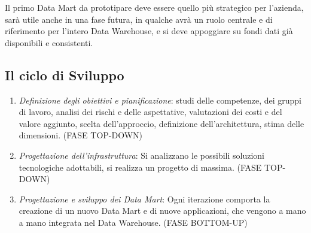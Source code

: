 Il primo Data Mart da prototipare deve essere quello più strategico per l'azienda, sarà utile anche in una fase futura, in qualche avrà un ruolo centrale e di riferimento per l'intero Data Warehouse, e si deve appoggiare su fondi dati già disponibili e consistenti.

\subsection{Il ciclo di Sviluppo}

\begin{enumerate}
	\item \textit{Definizione degli obiettivi e pianificazione}: studi delle competenze, dei gruppi di lavoro, analisi dei rischi e delle aspettative, valutazioni dei costi e del valore aggiunto, scelta dell'approccio, definizione dell'architettura, stima delle dimensioni. (FASE TOP-DOWN)
	\item \textit{Progettazione dell'infrastruttura}: Si analizzano le possibili soluzioni tecnologiche adottabili, si realizza un progetto di massima. (FASE TOP-DOWN)
	\item \textit{Progettazione e sviluppo dei Data Mart}: Ogni iterazione comporta la creazione di un nuovo Data Mart e di nuove applicazioni, che vengono a mano a mano integrata nel Data Warehouse. (FASE BOTTOM-UP)
\end{enumerate}

\newpage